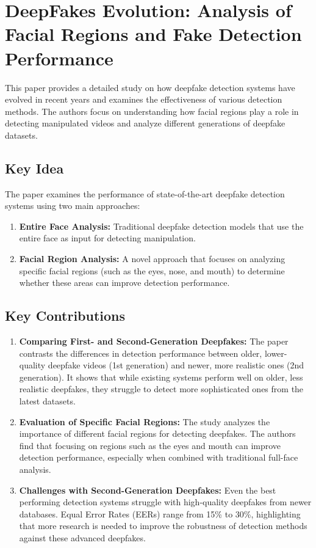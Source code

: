\documentclass{report}
\begin{document}
	
	
	
	
	
	
	\chapter{DeepFakes Evolution: Analysis of Facial Regions and Fake Detection Performance \cite{DBLP:journals/corr/abs-2004-07532}}
	
	This paper provides a detailed study on how deepfake detection systems have evolved in recent years and examines the effectiveness of various detection methods. The authors focus on understanding how facial regions play a role in detecting manipulated videos and analyze different generations of deepfake datasets.
	
	\section{Key Idea}
	The paper examines the performance of state-of-the-art deepfake detection systems using two main approaches:
	\begin{enumerate}
		\item 
		\textbf{Entire Face Analysis:} Traditional deepfake detection models that use the entire face as input for detecting manipulation.
		
		\item 
		\textbf{Facial Region Analysis:} A novel approach that focuses on analyzing specific facial regions (such as the eyes, nose, and mouth) to determine whether these areas can improve detection performance.
	\end{enumerate}
	
	\section{Key Contributions}
	\begin{enumerate}
		\item 
		\textbf{Comparing First- and Second-Generation Deepfakes:} The paper contrasts the differences in detection performance between older, lower-quality deepfake videos (1st generation) and newer, more realistic ones (2nd generation). It shows that while existing systems perform well on older, less realistic deepfakes, they struggle to detect more sophisticated ones from the latest datasets.
		
		\item 
		\textbf{Evaluation of Specific Facial Regions:} The study analyzes the importance of different facial regions for detecting deepfakes. The authors find that focusing on regions such as the eyes and mouth can improve detection performance, especially when combined with traditional full-face analysis.
		
		\item 
		\textbf{Challenges with Second-Generation Deepfakes:} Even the best performing detection systems struggle with high-quality deepfakes from newer databases. Equal Error Rates (EERs) range from 15\% to 30\%, highlighting that more research is needed to improve the robustness of detection methods against these advanced deepfakes.
	\end{enumerate}
	
\end{document}

